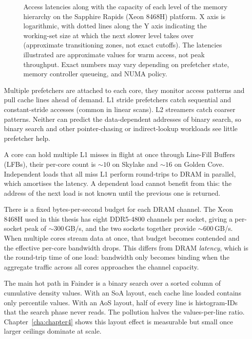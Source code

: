 \begin{figure}[h]
\caption[Memory-hierarchy access latencies on the measurement platform.]{Access latencies along with the capacity of each level of the memory hierarchy on the Sapphire Rapids (Xeon 8468H) platform. X axis is logarithmic, with dotted lines along the Y axis indicating the working-set size at which the next slower level takes over (approximate transitioning zones, not exact cutoffs). The latencies illustrated are approximate values for warm access, not peak throughput. Exact numbers may vary depending on prefetcher state, memory controller queueing, and NUMA policy.}
\label{fig:mem_hierarchy_latency}
\end{figure}


Multiple prefetchers are attached to each core, they monitor access patterns and pull cache lines ahead of demand. L1 stride prefetchers catch sequential and constant-stride accesses (common in linear scans). L2 streamers catch coarser patterns. Neither can predict the data-dependent addresses of binary search, so binary search and other pointer-chasing or indirect-lookup workloads see little prefetcher help.

A core can hold multiple L1 misses in flight at once through Line-Fill Buffers (LFBs), their per-core count is $\sim\!10$ on Skylake and $\sim\!16$ on Golden Cove. Independent loads that all miss L1 perform round-trips to DRAM in parallel, which amortises the latency. A dependent load cannot benefit from this: the address of the next load is not known until the previous one is returned.

There is a fixed bytes-per-second budget for each DRAM channel. The Xeon 8468H used in this thesis has eight DDR5-4800 channels per socket, giving a per-socket peak of $\sim\!300$\,GB/s, and the two sockets together provide $\sim\!600$\,GB/s. When multiple cores stream data at once, that budget becomes contended and the effective per-core bandwidth drops. This differs from DRAM \emph{latency}, which is the round-trip time of one load: bandwidth only becomes binding when the aggregate traffic across all cores approaches the channel capacity.

The main hot path in Fainder is a binary search over a sorted column of cumulative density values. With an SoA layout, each cache line loaded contains only percentile values. With an AoS layout, half of every line is histogram-IDs that the search phase never reads. The pollution halves the values-per-line ratio. Chapter~\ref{cha:chapter4} shows this layout effect is measurable but small once larger ceilings dominate at scale.

